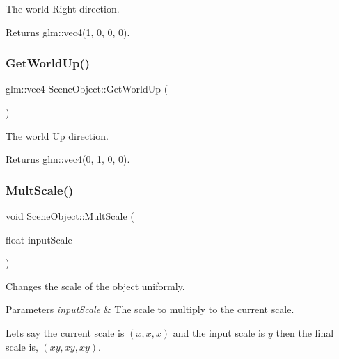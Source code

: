 The world \textquotesingle{}Right\textquotesingle{} direction.

\begin{DoxyReturn}{Returns}
glm\+::vec4(1, 0, 0, 0).
\end{DoxyReturn}
\hypertarget{class_scene_object_a334a5fb4e91d85fe6a046bd83dd235d3}{}\label{class_scene_object_a334a5fb4e91d85fe6a046bd83dd235d3}
\subsubsection{\texorpdfstring{Get\+World\+Up()}{GetWorldUp()}}
{\footnotesize\ttfamily glm\+::vec4 Scene\+Object\+::\+Get\+World\+Up (\begin{DoxyParamCaption}{ }\end{DoxyParamCaption})\hspace{0.3cm}{\ttfamily [static]}}



The world \textquotesingle{}Up\textquotesingle{} direction.

\begin{DoxyReturn}{Returns}
glm\+::vec4(0, 1, 0, 0).
\end{DoxyReturn}
\hypertarget{class_scene_object_a00d73ad3f7d77bfc0d3c1869decb97ea}{}\label{class_scene_object_a00d73ad3f7d77bfc0d3c1869decb97ea}
\subsubsection{\texorpdfstring{Mult\+Scale()}{MultScale()}}
{\footnotesize\ttfamily void Scene\+Object\+::\+Mult\+Scale (\begin{DoxyParamCaption}\item[{float}]{input\+Scale }\end{DoxyParamCaption})}



Changes the scale of the object uniformly.


\begin{DoxyParams}{Parameters}
{\em input\+Scale} & The scale to multiply to the current scale.\\
\hline
\end{DoxyParams}
Let\textquotesingle{}s say the current scale is $(x, x, x)$ and the input scale is $y$ then the final scale is, $(xy, xy, xy)$. \hypertarget{class_scene_object_ad516b213a389f6fc57229f65086978ee}{}\label{class_scene_object_ad516b213a389f6fc57229f65086978ee}
